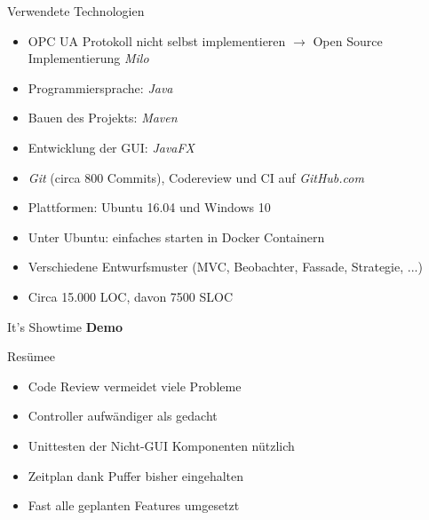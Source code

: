 \documentclass[22pt]{beamer}
\begin{document}
\begin{frame}{Verwendete Technologien}
\begin{itemize}[<+->]
 \item OPC UA Protokoll nicht selbst implementieren $\rightarrow$ Open Source Implementierung \emph{Milo}
 \item Programmiersprache: \emph{Java}
 \item Bauen des Projekts: \emph{Maven}
 \item Entwicklung der GUI: \emph{JavaFX}
 \item \emph{Git} (circa 800 Commits), Codereview und CI auf \emph{GitHub.com}
 \item Plattformen: Ubuntu 16.04 und Windows 10
 \item Unter Ubuntu: einfaches starten in Docker Containern
 \item Verschiedene Entwurfsmuster (MVC, Beobachter, Fassade, Strategie, ...)
 \item Circa 15.000 LOC, davon 7500 SLOC
\end{itemize}
\end{frame}

\begin{frame}{It's Showtime}
\centering
\huge
\textbf{Demo}
\end{frame}

\begin{frame}{Resümee}
\begin{itemize}[<+->]
 \item Code Review vermeidet viele Probleme
 \item Controller aufwändiger als gedacht
 \item Unittesten der Nicht-GUI Komponenten nützlich
 \item Zeitplan dank Puffer bisher eingehalten
 \item Fast alle geplanten Features umgesetzt
\end{itemize}
\end{frame}
\end{document}
